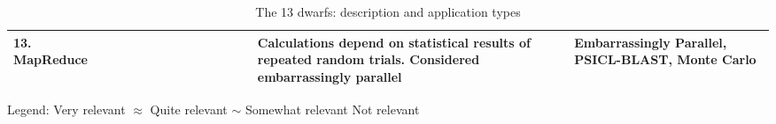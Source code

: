 \documentclass[landscape]{article}
\newcommand{\cm}{\ding{51}}%
\newcommand{\xm}{\ding{55}}%
\newcommand{\mm}{$\approx$}%
\newcommand{\lm}{$\sim$}%
\begin{document}
\begin{table}[h!]
{\begin{tabular}{@{}lccccccccccccm{12cm}m{4cm}@{}}
      13. MapReduce              &\xm&\xm&\cm&\xm&\cm&\xm&\cm&\xm&\xm&\xm&\xm&\xm& Calculations depend on statistical results of repeated random trials. Considered embarrassingly parallel & Embarrassingly Parallel, PSICL-BLAST, Monte Carlo \\
    \bottomrule
  \end{tabular}
  }
\caption{The 13 dwarfs: description and application types}
{\footnotesize\centering
 Legend:
 {\bf \cm} Very relevant\quad\quad\quad
 {\bf \mm} Quite relevant\quad\quad\quad
 {\bf \lm} Somewhat relevant\quad\quad\quad
 {\bf \xm} Not relevant
}
\label{tab:dwarfs}
\end{table}

\vspace{15cm}





































\end{document}
